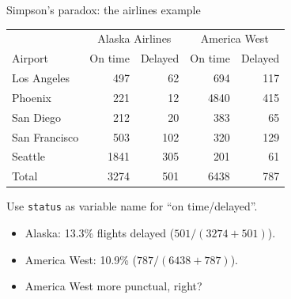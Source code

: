 \documentclass[unknownkeysallowed]{beamer}\usepackage[]{graphicx}\usepackage[]{color}
\begin{document}
\begin{frame}[fragile]{Simpson's paradox: the airlines example}

  \begin{tabular}{|l|rr|rr|}
    \hline
    & \multicolumn{2}{|c|}{Alaska Airlines} & 
    \multicolumn{2}{|c|}{America West}\\
    Airport & On time & Delayed & On time & Delayed\\
    \hline
    Los Angeles & 497 & 62 & 694 & 117\\
    Phoenix & 221 & 12 & 4840 & 415\\
    San Diego & 212 & 20 & 383 & 65\\
    San Francisco & 503 & 102 & 320 & 129 \\
    Seattle & 1841 & 305 & 201 & 61\\
    \hline
    Total & 3274 & 501 & 6438 & 787\\
    \hline
  \end{tabular}
  
  \vspace{2ex}
  
  Use \texttt{status} as variable name for ``on time/delayed''.

   \begin{itemize}
   \item Alaska: 13.3\% flights delayed ($501/(3274+501)$).
   \item America West: 10.9\% ($787/(6438+787)$).
   \item America West more punctual, right?
   \end{itemize}
 
\end{frame}
\end{document}
